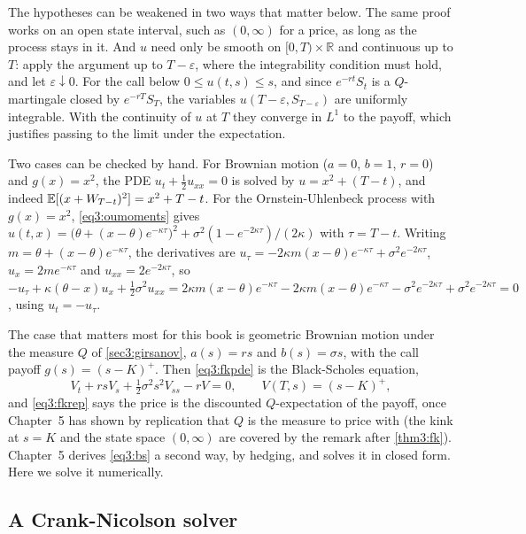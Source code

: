 \begin{chapterrefs}
\begin{remark}
The hypotheses can be weakened in two ways that matter below. The same proof works on an open state
interval, such as $(0,\infty)$ for a price, as long as the process stays in it. And $u$ need only be
smooth on $[0,T)\times\mathbb R$ and continuous up to $T$: apply the argument up to $T-\varepsilon$, where
the integrability condition must hold, and let $\varepsilon\downarrow0$. For the call below
$0\le u(t,s)\le s$, and since $e^{-rt}S_t$ is a $Q$-martingale closed by $e^{-rT}S_T$, the variables
$u(T-\varepsilon,S_{T-\varepsilon})$ are uniformly integrable. With the continuity of $u$ at $T$ they
converge in $L^1$ to the payoff, which justifies passing to the limit under the expectation.
\end{remark}

Two cases can be checked by hand. For Brownian motion ($a=0$, $b=1$, $r=0$) and $g(x)=x^2$, the PDE
$u_t+\tfrac12u_{xx}=0$ is solved by $u=x^2+(T-t)$, and indeed $\mathbb{E}[(x+W_{T-t})^2]=x^2+T-t$. For the
Ornstein-Uhlenbeck process with $g(x)=x^2$, \cref{eq3:oumoments} gives
$u(t,x)=\bigl(\theta+(x-\theta)e^{-\kappa\tau}\bigr)^2+\sigma^2(1-e^{-2\kappa\tau})/(2\kappa)$ with $\tau=T-t$.
Writing $m=\theta+(x-\theta)e^{-\kappa\tau}$, the derivatives are $u_\tau=-2\kappa m(x-\theta)e^{-\kappa\tau}+\sigma^2e^{-2\kappa\tau}$,
$u_x=2me^{-\kappa\tau}$ and $u_{xx}=2e^{-2\kappa\tau}$, so
$-u_\tau+\kappa(\theta-x)u_x+\tfrac12\sigma^2u_{xx}=2\kappa m(x-\theta)e^{-\kappa\tau}-2\kappa m(x-\theta)e^{-\kappa\tau}
-\sigma^2e^{-2\kappa\tau}+\sigma^2e^{-2\kappa\tau}=0$, using $u_t=-u_\tau$.

The case that matters most for this book is geometric Brownian motion under the measure $Q$ of
\cref{sec3:girsanov}, $a(s)=rs$ and $b(s)=\sigma s$, with the call payoff $g(s)=(s-K)^+$. Then
\cref{eq3:fkpde} is the Black-Scholes equation,
\begin{equation}\label{eq3:bs}
  V_t+rsV_s+\tfrac12\sigma^2s^2V_{ss}-rV=0,\qquad V(T,s)=(s-K)^+,
\end{equation}
and \cref{eq3:fkrep} says the price is the discounted $Q$-expectation of the payoff, once Chapter~5
has shown by replication that $Q$ is the measure to price with (the kink at
$s=K$ and the state space $(0,\infty)$ are covered by the remark after \cref{thm3:fk}). Chapter~5 derives
\cref{eq3:bs} a second way, by hedging, and solves it in closed form. Here we solve it numerically.

\subsection{A Crank-Nicolson solver}
\label{sec3:cn}


\end{chapterrefs}

